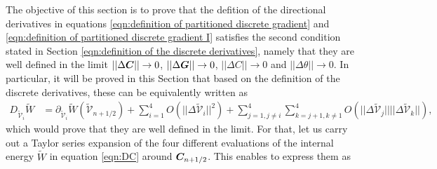 The objective of this section is to prove that the defition of the directional derivatives in equations \eqref{eqn:definition of partitioned discrete gradient} and \eqref{eqn:definition of partitioned discrete gradient I} satisfies the second condition stated in Section \ref{eqn:definition of the discrete derivatives}, namely that they are well defined in the limit $\vert\vert\Delta\boldsymbol{C}\vert\vert\rightarrow {0}$, 
$\vert\vert\Delta\boldsymbol{G}\vert\vert\rightarrow {0}$, 
$\vert\vert\Delta{C}\vert\vert\rightarrow {0}$ and $\vert\vert\Delta\theta\vert\vert\rightarrow 0$. In particular, it will be proved in this Section that based on the definition of the discrete derivatives, these can be equivalently written as
%
\begin{equation}\label{eqn:desired property convergence discrete gradient}
\begin{aligned}
D_{\widetilde{\mathcal{V}}_{i}}\widetilde{W} & = \partial_{\widetilde{\mathcal{V}}_i}\widetilde{W}\left(\widetilde{\mathcal{V}}_{n+1/2}\right) + \sum_{i=1}^4O\left(\vert\vert\Delta\widetilde{\mathcal{V}}_{i}\vert\vert^2\right) + \sum_{j=1,j\neq i}^4\sum_{k=j+1,k\neq 1}^4O\left(\vert\vert\Delta\widetilde{\mathcal{V}}_{j}\vert\vert\vert\vert\Delta\widetilde{\mathcal{V}}_{k}\vert\vert\right),
%
\end{aligned}
\end{equation}
%
which would prove that they are well defined in the limit. For that, let us carry out a Taylor series expansion of the four different evaluations of the internal energy $\widetilde{W}$ in equation \eqref{eqn:DC} around $\boldsymbol{C}_{n+1/2}$. This enables to express them as
%
